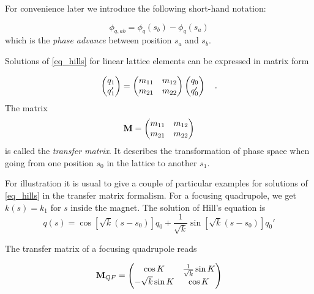 For convenience later we introduce the following short-hand notation:

\begin{equation}
    \phi_{q,ab} = \phi_q(s_b) - \phi_q(s_a)
\end{equation}
which is the \emph{phase advance} between position $s_a$ and $s_b$.

Solutions of \eqref{eq_hills} for linear lattice elements can be expressed in matrix form

\begin{equation}
    \begin{pmatrix}
        q_1\\
        q_1'
    \end{pmatrix}
    =
    \begin{pmatrix}
        m_{11} & m_{12} \\
        m_{21} & m_{22}
    \end{pmatrix}
    \begin{pmatrix}
        q_0\\
        q_0'
    \end{pmatrix}
    \quad .
    \label{eq_matrix_element}
\end{equation}
The matrix 
\begin{equation}
    \mathbf{M} = 
    \begin{pmatrix}
        m_{11} & m_{12} \\
        m_{21} & m_{22}
    \end{pmatrix}
    \label{eq_trmat}
\end{equation}
is called the \emph{transfer matrix}. It describes the transformation
of phase space when going from one position $s_0$ in the lattice to another $s_1$.

For illustration it is usual to give a couple of particular examples for solutions of \eqref{eq_hills}
in the transfer matrix formalism.
For a focusing quadrupole, we get $k(s) = k_1$ for $s$ inside the magnet. The solution of Hill's equation is
\begin{equation}
    q(s) = \cos \left[ \sqrt{k}(s-s_0)\right] q_0 + \frac{1}{\sqrt{k}}\sin\left[\sqrt{k}(s-s_0)\right]q_0'
\end{equation}

The transfer matrix of a focusing quadrupole reads

\begin{equation}
    \mathbf{M}_{QF} =
    \begin{pmatrix}
        \cos K & \frac{1}{\sqrt{k}} \sin K \\
        -\sqrt{k}\sin K & \cos K
    \end{pmatrix}
\end{equation}

